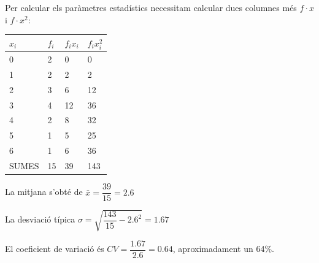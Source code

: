 \begin{resolt}
		\vspace{0.24cm}
		
		Per calcular els paràmetres estadístics necessitam calcular dues columnes més $f\cdot x$ i $f\cdot x^2$:
		\begin{center}
			\begin{tabular}{|p{0.7in}|p{0.8in}|p{0.8in}|p{0.8in}|} \hline 
				$x_i$ & $f_i$ & $f_i x_i$ & $f_i x_i^2$\\ \hline 
				0 & 2 & 0 & 0 \\ \hline 
				1 & 2 & 2 & 2 \\ \hline 
				2 & 3 & 6 & 12\\ \hline 
				3 & 4 & 12 & 36 \\ \hline 
				4 & 2 & 8 &  32\\ \hline
				5 & 1 & 5 &  25\\ \hline
				6 & 1 & 6 &  36\\ \hline\hline
				\rowcolor{lightgray} SUMES & 15 &  39  & 143 \\ \hline 
			\end{tabular}
		\end{center}	\vspace{0.24cm}
		
		La mitjana s'obté de $\bar x = \dfrac{39}{15}=2.6$
		
		La desviació típica  $\sigma = \sqrt{ \dfrac{143}{15}-2.6^2 }=1.67$
		
		El coeficient de variació és $CV = \dfrac{1.67}{2.6}=0.64$, aproximadament un 64\%.
		
	\end{resolt}
	\vspace{1cm}
	
	\newpage
	
